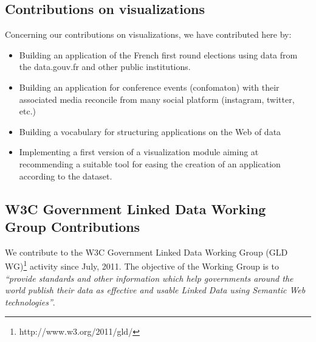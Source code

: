 \documentclass[a4paper,11pt]{report}
\begin{document}
\subsection{Contributions on visualizations}
Concerning our contributions on visualizations, we have contributed here by:
\begin{itemize}
\item Building an application of the French first round elections using data from the data.gouv.fr and other public institutions.
\item Building an application for conference events (confomaton) with their associated media reconcile from many social platform (instagram, twitter, etc.)
\item Building a vocabulary for structuring applications on the Web of data
\item Implementing a first version of a visualization module aiming at recommending a suitable tool for easing the creation of an application according to the dataset.

\end{itemize}

\subsection{W3C Government Linked Data Working Group Contributions}
We contribute to the W3C Government Linked Data Working Group (GLD WG)\footnote{http://www.w3.org/2011/gld/} activity since July, 2011.  The objective of the Working Group is to \textit{``provide standards and other information which help 
governments around the world publish their data as effective and usable Linked Data using Semantic Web technologies''}. %
\end{document}
